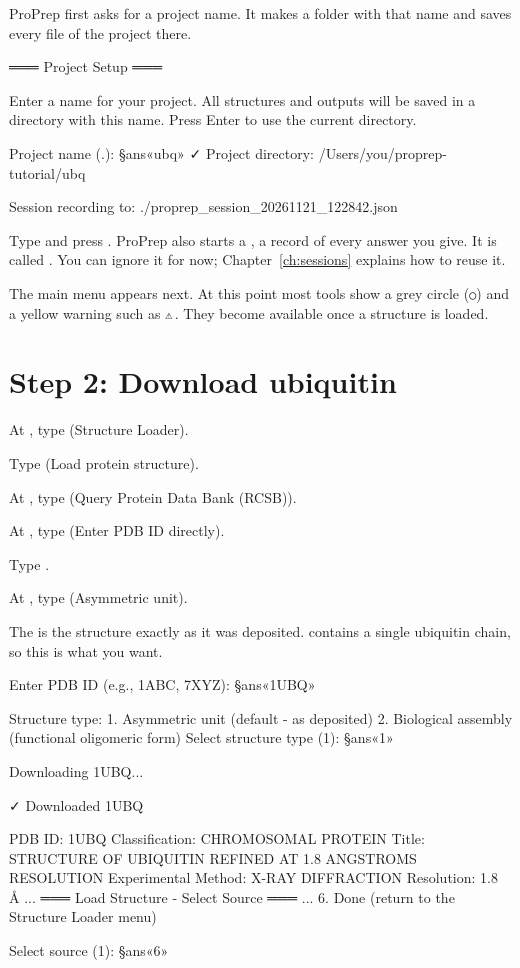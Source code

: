 ProPrep first asks for a project name. It makes a folder with that name and
saves every file of the project there.

\begin{screen}
═══ Project Setup ═══

Enter a name for your project. All structures and outputs
will be saved in a directory with this name.
Press Enter to use the current directory.

Project name (.): §ans«ubq»
✓ Project directory: /Users/you/proprep-tutorial/ubq

Session recording to: ./proprep_session_20261121_122842.json
\end{screen}

Type  and press . ProPrep also starts a
, a record of every answer you give. It is called
. You can ignore it for now; Chapter~\ref{ch:sessions}
explains how to reuse it.

The main menu appears next. At this point most tools show a grey circle
(\texttt{○}) and a yellow warning such as \texttt{⚠}\,.
They become available once a structure is loaded.

\section{Step 2: Download ubiquitin}

\begin{steps}
  \item At , type  (Structure Loader).
  \item Type  (Load protein structure).
  \item At , type  (Query Protein Data Bank (RCSB)).
  \item At , type  (Enter PDB ID directly).
  \item Type .
  \item At , type  (Asymmetric unit).
\end{steps}

The  is the structure exactly as it was deposited.
 contains a single ubiquitin chain, so this is what you want.

\begin{screen}
Enter PDB ID (e.g., 1ABC, 7XYZ): §ans«1UBQ»

Structure type:
  1. Asymmetric unit (default - as deposited)
  2. Biological assembly (functional oligomeric form)
Select structure type (1): §ans«1»

Downloading 1UBQ...

✓ Downloaded 1UBQ

PDB ID: 1UBQ
Classification: CHROMOSOMAL PROTEIN
Title: STRUCTURE OF UBIQUITIN REFINED AT 1.8 ANGSTROMS RESOLUTION
Experimental Method: X-RAY DIFFRACTION
Resolution: 1.8 Å
...
═══ Load Structure - Select Source ═══
...
6. Done (return to the Structure Loader menu)

Select source (1): §ans«6»
\end{screen}

